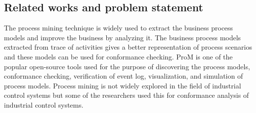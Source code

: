 \begin{bibunit}

\section{Related works and problem statement}
\label{sec:relatedwork}

The process mining technique \cite{10.1007/BFb0101003} \cite{van2012process1} is widely used to extract the business process models and improve the business by analyzing it. The business process models extracted from trace of activities gives a better representation of process scenarios and these models can be used for conformance checking. ProM\cite{van2005prom} is one of the popular open-source tools used for the purpose of discovering the process models, conformance checking, verification of event log, visualization, and simulation of process models. Process mining is not widely explored in the field of industrial control systems but some of the researchers used this for conformance analysis of industrial control systems.



\end{bibunit}
